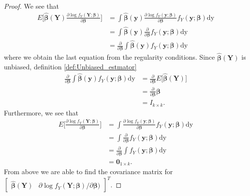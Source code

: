 \begin{proof}
We see that
\begin{align*}
    E\Big[\boldsymbol{\hat{\beta}}(\textbf{Y}) \frac{\partial \log f_Y(\textbf{Y};\boldsymbol{\beta})}{\partial \boldsymbol{\beta}} \Big]
    &=\int \boldsymbol{\hat{\beta}}(\textbf{y})\frac{\partial \log f_Y(\textbf{y};\boldsymbol{\beta})}{\partial \boldsymbol{\beta}}f_Y(\textbf{y};\boldsymbol{\beta}) \text{dy} \\
    &=\int \boldsymbol{\hat{\beta}}(\textbf{y}) \frac{\partial}{\partial \boldsymbol{\beta}}f_Y(\textbf{y};\boldsymbol{\beta}) \text{dy} \\
    &=\frac{\partial}{\partial \boldsymbol{\beta}} \int \boldsymbol{\hat{\beta}}(\textbf{y}) f_Y(\textbf{y};\boldsymbol{\beta}) \text{dy}
\end{align*}
where we obtain the last equation from the regularity conditions. 
Since $\boldsymbol{\hat{\beta}}(\textbf{Y})$ is unbiased, definition \ref{def:Unbiased_estmator} 
\begin{align}
    \frac{\partial}{\partial \boldsymbol{\beta}} \int \boldsymbol{\hat{\beta}}(\textbf{y}) f_Y(\textbf{y};\boldsymbol{\beta}) \text{dy} &= \frac{\partial}{\partial\boldsymbol{\beta}} E\big[ \boldsymbol{\hat{\beta}}(\textbf{Y})\big] \nonumber\\
    &= \frac{\partial}{\partial\boldsymbol{\beta}} \boldsymbol{\beta} \nonumber\\
    &= I_{k\times k} \label{eq:cramerraoe2stjerner}.
\end{align}
Furthermore, we see that
\begin{align}
    E\Big[ \frac{\partial \log f_Y(\textbf{Y};\boldsymbol{\beta})}{\partial \boldsymbol{\beta}}\Big] &= \int \frac{\partial \log f_Y(\textbf{y};\boldsymbol{\beta})}{\partial \boldsymbol{\beta}}f_Y(\textbf{y};\boldsymbol{\beta}) \text{dy} \nonumber \\
    &=\int  \frac{\partial}{\partial \boldsymbol{\beta}}f_Y(\textbf{y};\boldsymbol{\beta}) \text{dy} \nonumber \\
    &=\frac{\partial}{\partial \boldsymbol{\beta}} \int f_Y(\textbf{y};\boldsymbol{\beta}) \text{dy} \nonumber \\
    &= \textbf{0}_{1 \times k} \label{eq:cramerraoe3stjerner}.
\end{align}
From above we are able to find the covariance matrix for $\begin{bmatrix} \boldsymbol{\hat{\beta}}(\textbf{Y}) & \partial \log f_Y(\textbf{Y};\boldsymbol{\beta})/\partial \boldsymbol{\beta}) \end{bmatrix}^T$.

\end{proof}
